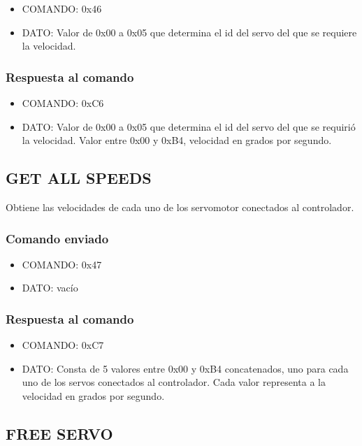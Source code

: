 \documentclass[a4paper,10pt]{article}
\begin{document}
\begin{itemize}
	\item{COMANDO:} 0x46
	\item{DATO:} Valor de 0x00 a 0x05 que determina el id del servo del que se requiere la velocidad.
\end{itemize}

\subsubsection*{Respuesta al comando}

\begin{itemize}
	\item{COMANDO:} 0xC6
	\item{DATO:} Valor de 0x00 a 0x05 que determina el id del servo del que se requiri\'o la velocidad.
	Valor entre 0x00 y 0xB4, velocidad en grados por segundo.
\end{itemize}

\subsection{GET ALL SPEEDS}
\label{get_all_speeds}

Obtiene las velocidades de cada uno de los servomotor conectados al controlador.

\subsubsection*{Comando enviado}

\begin{itemize}
	\item{COMANDO:} 0x47
	\item{DATO:} vac\'io
\end{itemize}

\subsubsection*{Respuesta al comando}

\begin{itemize}
	\item{COMANDO:} 0xC7
	\item{DATO:} Consta de 5 valores entre 0x00 y 0xB4 concatenados, uno para cada uno de los servos conectados al controlador.
	Cada valor representa a la velocidad en grados por segundo.
\end{itemize}

\subsection{FREE SERVO}
\label{free_servo}
\end{document}
